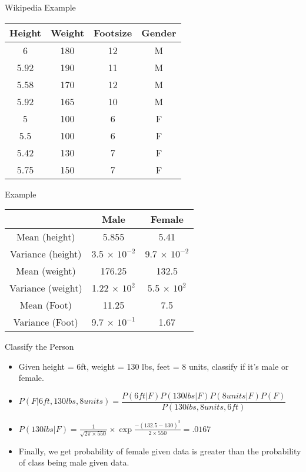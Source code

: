\documentclass{beamer}
\begin{document}
\begin{frame}{Wikipedia Example}

    \begin{center}
    \begin{tabular}{|c|c|c|c|}
    \hline
    Height&Weight&Footsize&Gender\\
    \hline
    \hline
         6 & 180& 12& M \\
         5.92 & 190& 11& M \\
         5.58 & 170& 12& M \\
         5.92 & 165& 10& M \\
         5 & 100& 6& F \\
         5.5 & 100& 6& F \\
         5.42 & 130& 7& F \\
         5.75 & 150& 7& F \\
         \hline
    \end{tabular}
    
    \end{center}
    
\end{frame}

\begin{frame}{Example}
    \begin{center}
        
    
    \begin{tabular}{|c|c|c|}
    \hline
     &Male&Female\\
     \hline
     \hline
     Mean (height) & 5.855 & 5.41  \\
     Variance (height) & 3.5 $\times$ $10^{-2}$ & 9.7 $\times$ $10^{-2}$  \\
     Mean (weight) & 176.25 & 132.5  \\
     Variance (weight) & 1.22 $\times$ $10^{2}$ & 5.5 $\times$ $10^{2}$   \\
     Mean (Foot) & 11.25 & 7.5  \\
     Variance (Foot) & 9.7 $\times$ $10^{-1}$ & 1.67  \\
    \hline
    \hline
    \end{tabular}
    \end{center}
\end{frame}


\begin{frame}{Classify the Person}
    \begin{itemize}[<+->]
        \item  Given height = 6ft, weight = 130 lbs, feet = 8 units, classify if it's male or female.
        \item $P(F|6ft, 130 lbs, 8 units) = \dfrac{P(6 ft|F)P(130 lbs|F)P(8 units|F)P(F)}{P(130 lbs, 8 units, 6 ft)}$
        \item $P(130 lbs|F) = \frac{1}{\sqrt{2\pi\times 550}}\times \exp{\frac{-(132.5-130)^2}{2\times 550}} = .0167$
        \item Finally, we get probability of female given data is greater than the probability of class being male given data.

    \end{itemize}
    
\end{frame}
\end{document}
